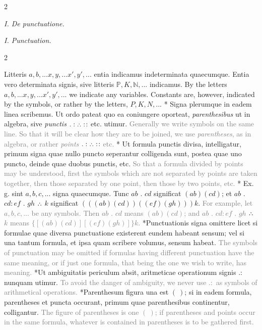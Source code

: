 \documentclass{book}
\newcommand{\pppNoSpace}{\leavevmode\lower0ex\hbox{.}\kern-0.1em\raise0.7ex\hbox{.}\kern-0.1em\lower0ex\hbox{.}} %
\newcommand\irrelavent[1]{\textcolor{gray}{#1}}
\newcommand\peanoHeadingSmall[1]{ \vspace{0.75cm} \textit{#1} \nopagebreak[4]

\vspace{0.25cm} \nopagebreak[1]}
\newenvironment{translateTwoCol}
               { %
                 \columnratio{0.5, 0.5} \begin{paracol}{2}
                 \newcommand{\LAT}{\switchcolumn[0]*}
                 \newcommand{\ENG}{\switchcolumn[1]}
               }
               { %
                 \let\ENG\undefined
                 \let\LAT\undefined
                 \end{paracol}
               }
\begin{document}
\begin{translateTwoCol}
\centering
{}
{}
\peanoHeadingSmall{I. De punctuatione.}
\ENG
\peanoHeadingSmall{I. Punctuation.}
\end{translateTwoCol}

\begin{translateTwoCol}
Litteris $a,b,... x,y,... x', y',...$ entia indicamus indeterminata quaecumque. Entia vero determinata signis, sive litteris $\mathbb{P}, K, \mathbb{N},...$ indicamus.
\ENG
By the letters $a,b,... x,y,... x', y',...$ we indicate any variables. Constants are, however, indicated by the symbols, or rather by the letters, $P, K, N,...$
\LAT
Signa plerumque in eadem linea scribemus. Ut ordo pateat quo ea coniungere oporteat, \emph{parenthesibus} ut in algebra, sive \emph{punctis} $. : \pppNoSpace :\hspace{0.1em}:$ etc. utimur.
\ENG
\irrelavent{Generally we write symbols on the same line. So that it will be clear how they are to be joined, we use \emph{parentheses}, as in algebra, or rather \emph{points} $. : \pppNoSpace :\hspace{0.1em}:$ etc.}
\LAT
Ut formula punctis divisa, intelligatur, primum signa quae nullo puncto seperantur colligenda sunt, postea quae uno puncto, deinde quae duobus punctis, etc.
\ENG
\irrelavent{So that a formula divided by points may be understood, first the symbols which are not separated by points are taken together, then those separated by one point, then those by two points, etc.}
\LAT
Ex. g. sint $a,b,c,...$ signa quaecumque. Tunc $ab$ $.$ $cd$ significat $(ab)(cd)$; et $ab$ $.$ $cd:ef$ $.$ $gh$ $\pppNoSpace$ $k$ significat $(((ab)(cd))((ef)(gh)))k$.
\ENG
\irrelavent{For example, let $a,b,c,...$ be any symbols. Then $ab$ $.$ $cd$ means $(ab)(cd)$; and $ab$ $.$ $cd:ef$ $.$ $gh$ $\pppNoSpace$ $k$ means $\{[(ab)(cd)][(ef)(gh)]\}k$.}
\LAT Punctuationis signa omittere licet si formulae quae diversa punctuatione existerent eundem habeant sensum; vel si una tantum formula, et ipsa quam scribere volumus, sensum habeat.
\ENG \irrelavent{The symbols of punctuation may be omitted if formulas having different punctuation have the same meaning, or if just one formula, that being the one we wish to write, has meaning.}
\LAT Ut ambiguitatis periculum absit, aritmeticae operationum signis $. :$ nunquam utimur.
\ENG \irrelavent{To avoid the danger of ambiguity, we never use $. :$ as symbols of arithmetical operations.}
\LAT Parenthesum figura una est $( \ )$; si in eadem formula, parentheses et puncta occurant, primum quae parenthesibus continentur, colligantur.
\ENG \irrelavent{The figure of parentheses is one $( \ )$; if parentheses and points occur in the same formula, whatever is contained in parentheses is to be gathered first.}
\end{translateTwoCol}
\end{document}
